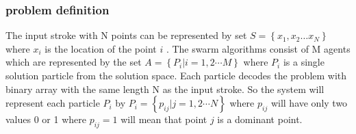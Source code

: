\documentclass[a4paper,10pt]{IEEEconf}
\begin{document}
\subsubsection{ problem definition}
The input stroke with N points can be represented by set $S = \left\{ {x_1 ,x_2  \ldots x_N } \right\}$ where $x_i$ is the location of the point $i$ . The swarm algorithms consist of M agents which are represented by the set 
$A  = \left\{ {P_i \left| {i = 1,2 \cdots M} \right.} \right\}$ where $P_i$ is a single solution particle from the solution space. Each particle decodes the problem with binary array with the same length N as the input stroke.  
So the system will represent each particle $P_i$ by $P_i = \left\{ {p_{ij} \left| {j = 1,2 \cdots N} \right.} \right\}$ where $p_{ij}$ will have only two values 0 or 1 where $p_{ij}=1$ will mean that point $j$ is a dominant point. 
\end{document}
